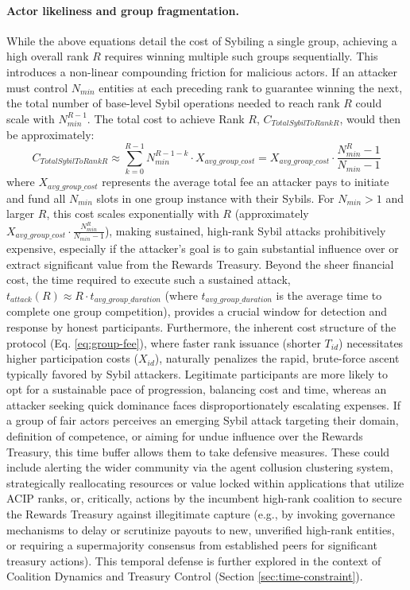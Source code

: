 \documentclass{article}
\begin{document}
\begin{CJK}{UTF8}{gbsn}
        \paragraph{Actor likeliness and group fragmentation.}
        While the above equations detail the cost of Sybiling a single group, achieving a high overall rank $R$ requires winning multiple such groups sequentially. This introduces a non-linear compounding friction for malicious actors. If an attacker must control $N_{min}$ entities at each preceding rank to guarantee winning the next, the total number of base-level Sybil operations needed to reach rank $R$ could scale with $N_{min}^{R-1}$. The total cost to achieve Rank $R$, $C_{TotalSybilToRankR}$, would then be approximately:
        \begin{equation}
            \label{eq:total_sybil_cost_to_rank_R}
            C_{TotalSybilToRankR} \approx \sum_{k=0}^{R-1} N_{min}^{R-1-k} \cdot X_{avg\_group\_cost} = X_{avg\_group\_cost} \cdot \frac{N_{min}^R - 1}{N_{min}-1}
        \end{equation}
        where $X_{avg\_group\_cost}$ represents the average total fee an attacker pays to initiate and fund all $N_{min}$ slots in one group instance with their Sybils. For $N_{min} > 1$ and larger $R$, this cost scales exponentially with $R$ (approximately $X_{avg\_group\_cost} \cdot \frac{N_{min}^R}{N_{min}-1}$), making sustained, high-rank Sybil attacks prohibitively expensive, especially if the attacker's goal is to gain substantial influence over or extract significant value from the Rewards Treasury.
        Beyond the sheer financial cost, the time required to execute such a sustained attack, $t_{attack}(R) \approx R \cdot t_{avg\_group\_duration}$ (where $t_{avg\_group\_duration}$ is the average time to complete one group competition), provides a crucial window for detection and response by honest participants. {{Furthermore, the inherent cost structure of the protocol (Eq. \ref{eq:group-fee}), where faster rank issuance (shorter $T_{id}$) necessitates higher participation costs ($X_{id}$), naturally penalizes the rapid, brute-force ascent typically favored by Sybil attackers. Legitimate participants are more likely to opt for a sustainable pace of progression, balancing cost and time, whereas an attacker seeking quick dominance faces disproportionately escalating expenses.}} If a group of fair actors perceives an emerging Sybil attack targeting their domain, definition of competence, or aiming for undue influence over the Rewards Treasury, this time buffer allows them to take defensive measures. These could include alerting the wider community via the agent collusion clustering system, strategically reallocating resources or value locked within applications that utilize ACIP ranks, or, critically, actions by the incumbent high-rank coalition to secure the Rewards Treasury against illegitimate capture (e.g., by invoking governance mechanisms to delay or scrutinize payouts to new, unverified high-rank entities, or requiring a supermajority consensus from established peers for significant treasury actions). This temporal defense is further explored in the context of Coalition Dynamics and Treasury Control (Section \ref{sec:time-constraint}).

\end{CJK}
\end{document}
